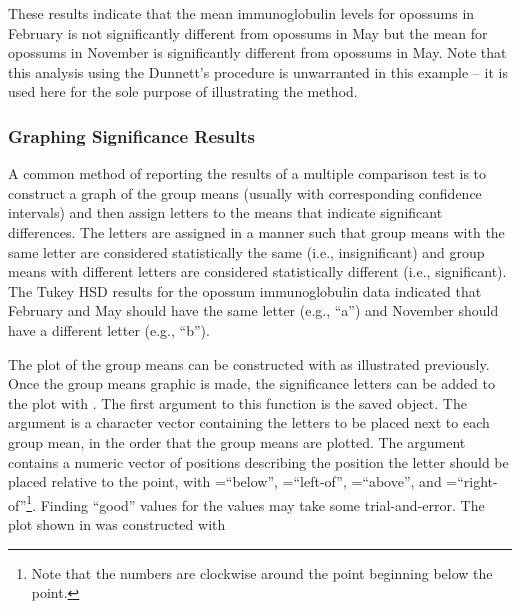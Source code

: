 \documentclass[10pt,openany]{book}\usepackage[]{graphicx}\usepackage[]{color}
\begin{document}
These results indicate that the mean immunoglobulin levels for opossums in February is not significantly different from opossums in May but the mean for opossums in November is significantly different from opossums in May.  Note that this analysis using the Dunnett's procedure is unwarranted in this example -- it is used here for the sole purpose of illustrating the method.

\subsubsection*{Graphing Significance Results}
A common method of reporting the results of a multiple comparison test is to construct a graph of the group means (usually with corresponding confidence intervals) and then assign letters to the means that indicate significant differences.  The letters are assigned in a manner such that group means with the same letter are considered statistically the same (i.e., insignificant) and group means with different letters are considered statistically different (i.e., significant).  The Tukey HSD results for the opossum immunoglobulin data indicated that February and May should have the same letter (e.g., ``a'') and November should have a different letter (e.g., ``b'').

The plot of the group means can be constructed with  as illustrated previously.  Once the group means graphic is made, the significance letters can be added to the plot with .  The first argument to this function is the saved  object.  The  argument is a character vector containing the letters to be placed next to each group mean, in the order that the group means are plotted.  The  argument contains a numeric vector of positions describing the position the letter should be placed relative to the point, with =``below'', =``left-of'', =``above'', and =``right-of''\footnote{Note that the numbers are clockwise around the point beginning below the point.}.  Finding ``good'' values for the  values may take some trial-and-error.  The plot shown in  was constructed with
\end{document}

